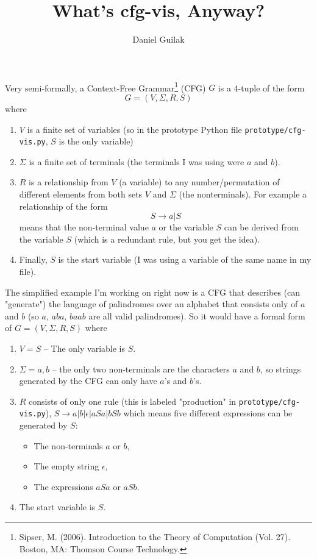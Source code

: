 \documentclass[•]{article}
\author{Daniel Guilak}
\title{What's cfg-vis, Anyway?}
\date{}
\begin{document}
\maketitle
Very semi-formally, a Context-Free Grammar\footnote{Sipser, M. (2006). Introduction to the Theory of Computation (Vol. 27). Boston, MA: Thomson Course Technology.} (CFG) $G$ is a 4-tuple of the form
\begin{equation}
	G=(V,\Sigma,R,S)
\end{equation}
where
\begin{enumerate}
	\item $V$ is a finite set of variables (so in the prototype Python file \texttt{prototype/cfg-vis.py}, $S$ is the only variable)
	\item $\Sigma$ is a finite set of terminals (the terminals I was using were $a$ and $b$).
	\item $R$ is a relationship from $V$ (a variable) to any number/permutation of different elements from both sets $V$ and $\Sigma$ (the nonterminals). For example a relationship of the form
	\begin{equation}
	S \rightarrow a | S
	\end{equation}
means that the non-terminal value $a$ or the variable $S$ can be derived from the variable $S$ (which is a redundant rule, but you get the idea).
	\item Finally, $S$ is the start variable (I was using a variable of the same name in my file).
\end{enumerate}

The simplified example I'm working on right now is a CFG that describes (can "generate") the language of palindromes over an alphabet that consists only of $a$ and $b$ (so $a$, $aba$, $baab$ are all valid palindromes). So it would have a formal form of $G=(V,\Sigma,R,S)$ where
\begin{enumerate}
	\item $V={S}$ -- The only variable is $S$.
	\item $\Sigma={a,b}$ -- the only two non-terminals are the characters $a$ and $b$, so strings generated by the CFG can only have $a$'s and $b$'s.
	\item $R$ consists of only one rule (this is labeled "production" in \texttt{prototype/cfg-vis.py}), $S \rightarrow a | b | \epsilon | aSa | bSb$ which means five different expressions can be generated by $S$:
	\begin{itemize}
		\item The non-terminals $a$ or $b$,
		\item The empty string $\epsilon$,
		\item The expressions $aSa$ or $aSb$.
	\end{itemize}
	\item The start variable is $S$.
\end{enumerate}
\end{document}
